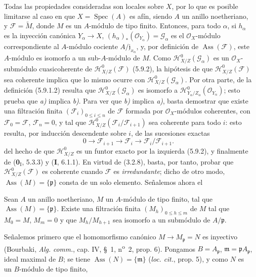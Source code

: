 Todas las propiedades consideradas son locales sobre $X$, por lo que es posible
limitarse al caso en que $X=\operatorname{Spec}(A)$ es afín, siendo $A$ un
anillo noetheriano, y $\mathcal F=\widetilde M$, donde $M$ es un $A$-módulo
de tipo finito. Entonces, para todo $\alpha$, si $h_\alpha$ es la inyección
canónica $Y_\alpha\to X$,
$(h_\alpha)_*(\mathcal O_{Y_\alpha})=\mathcal G_\alpha$ es el
$\mathcal O_X$-módulo correspondiente al $A$-módulo cociente
$A/\mathfrak j_{x_\alpha}$, y, por definición de
$\operatorname{Ass}(\mathcal F)$, este $A$-módulo es isomorfo a un
sub-$A$-módulo de $M$. Como $\mathcal H^0_{X/Z}(\mathcal G_\alpha)$ es un
$\mathcal O_X$-submódulo cuasicoherente de
$\mathcal H^0_{X/Z}(\mathcal F)$ (5.9.2), la hipótesis de que
$\mathcal H^0_{X/Z}(\mathcal F)$ sea coherente implica que lo mismo ocurre con
$\mathcal H^0_{X/Z}(\mathcal G_\alpha)$. Por otra parte, de la
definición (5.9.1.2) resulta que $\mathcal H^0_{X/Z}(\mathcal G_\alpha)$ es
isomorfo a
$\mathcal H^0_{Y_\alpha/Z_\alpha}(\mathcal O_{Y_\alpha})$;
esto prueba que \emph{a)} implica \emph{b)}. Para ver que \emph{b)} implica \emph{a)}, basta demostrar que
existe una filtración finita $(\mathcal F_i)_{0\leq i\leq n}$ de
$\mathcal F$ formada por $\mathcal O_X$-módulos coherentes, con
$\mathcal F_0=\mathcal F$, $\mathcal F_n=0$, y tal que
$\mathcal H^0_{X/Z}(\mathcal F_i/\mathcal F_{i+1})$ sea coherente para todo
$i$: esto resulta, por inducción descendente sobre $i$, de las sucesiones
exactas
\[
0\longrightarrow\mathcal F_{i+1}\longrightarrow\mathcal F_i
\longrightarrow\mathcal F_i/\mathcal F_{i+1}.
\]
del hecho de que $\mathcal H^0_{X/Z}$ es un funtor exacto por la izquierda
(5.9.2), y finalmente de (\textbf 0$_\mathrm I$, 5.3.3) y (\textbf I, 6.1.1). En virtud de
(3.2.8), basta, por tanto, probar que
$\mathcal H^0_{X/Z}(\mathcal F)$ es coherente cuando $\mathcal F$ es
\emph{irredundante}; dicho de otro modo,
$\operatorname{Ass}(M)=\{\mathfrak p\}$ consta de un solo elemento. Señalemos
ahora el

\begin{lemma}[5.11.1.1]
\label{IV.2.s5.11.1.1-fr}
Sean $A$ un anillo noetheriano, $M$ un $A$-módulo de tipo finito, tal que
$\operatorname{Ass}(M)=\{\mathfrak p\}$. Existe una filtración finita
$(M_h)_{0\leq h\leq m}$ de $M$ tal que $M_0=M$, $M_m=0$ y que
$M_h/M_{h+1}$ sea isomorfo a un submódulo de $A/\mathfrak p$.
\end{lemma}

Señalemos primero que el homomorfismo canónico $M\to M_\mathfrak p=N$ es
inyectivo (Bourbaki, \emph{Alg. comm.}, cap. IV, \S~1, n\textsuperscript{o}~2,
prop. 6). Pongamos $B=A_\mathfrak p$, $\mathfrak m=\mathfrak pA_\mathfrak p$,
ideal maximal de $B$; se tiene $\operatorname{Ass}(N)=\{\mathfrak m\}$
(\emph{loc. cit.}, prop. 5), y como $N$ es un $B$-módulo de tipo finito,

